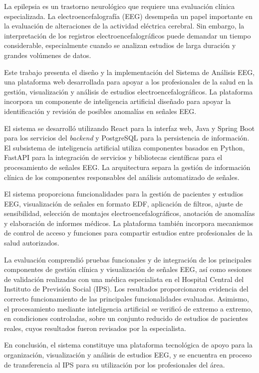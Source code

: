 
\begin{resumen}
\small

La epilepsia es un trastorno neurológico que requiere una
evaluación clínica especializada. La electroencefalografía
(EEG) desempeña un papel importante en la evaluación de
alteraciones de la actividad eléctrica cerebral. Sin
embargo, la interpretación de los registros
electroencefalográficos puede demandar un tiempo
considerable, especialmente cuando se analizan estudios
de larga duración y grandes volúmenes de datos.

Este trabajo presenta el diseño y la implementación del Sistema de Análisis EEG, una plataforma web desarrollada para apoyar
a los profesionales de la salud en la gestión,
visualización y análisis de estudios
electroencefalográficos. La plataforma incorpora un
componente de inteligencia artificial diseñado para
apoyar la identificación y revisión de posibles
anomalías en señales EEG.

El sistema se desarrolló utilizando React para la
interfaz web, Java y Spring Boot para los servicios
del \textit{backend} y PostgreSQL para la persistencia
de información. El subsistema de inteligencia
artificial utiliza componentes basados en Python,
FastAPI para la integración de servicios y bibliotecas
científicas para el procesamiento de señales EEG.
La arquitectura separa la gestión de información
clínica de los componentes responsables del análisis
automatizado de señales.

El sistema proporciona funcionalidades para la gestión
de pacientes y estudios EEG, visualización de señales
en formato EDF, aplicación de filtros, ajuste
de sensibilidad, selección de montajes
electroencefalográficos, anotación de anomalías y
elaboración de informes médicos. La plataforma también
incorpora mecanismos de control de acceso y funciones
para compartir estudios entre profesionales de la
salud autorizados.

La evaluación comprendió pruebas funcionales y de
integración de los principales componentes de gestión
clínica y visualización de señales EEG, así como
sesiones de validación realizadas con una médica
especialista en el Hospital Central del Instituto
de Previsión Social (IPS). Los resultados
proporcionaron evidencia del correcto funcionamiento
de las principales funcionalidades evaluadas.
Asimismo, el procesamiento mediante inteligencia artificial se verificó de extremo a extremo, en condiciones controladas, sobre un conjunto reducido de estudios de pacientes reales, cuyos resultados fueron revisados por la especialista.

En conclusión, el sistema constituye una plataforma
tecnológica de apoyo para la organización,
visualización y análisis de estudios EEG, y se encuentra en proceso de transferencia al IPS para su utilización por los profesionales del área.

\end{resumen}